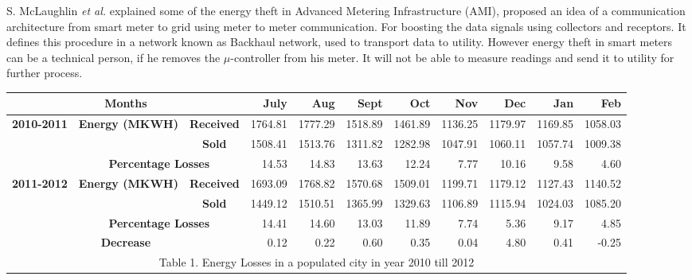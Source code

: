\documentclass[10pt, conference, compsocconf]{IEEEtran}
\begin{document}
S. McLaughlin \textit{et al.} explained some of the energy theft in Advanced Metering Infrastructure (AMI), proposed an idea of a communication architecture from smart meter to grid using meter to meter communication. For boosting the data signals using collectors and receptors. It defines this procedure in a network known as Backhaul network, used to transport data to utility. However energy theft in smart meters can be a technical person, if he removes the $\mu$-controller from his meter. It will not be able to measure readings and send it to utility for further process.

\begin{table*}[t]
\begin{center}
\begin{tabular}{|m{2cm}|c|c|r|r|r|r|r|r|r|r|}
\hline
\multicolumn{ 3}{|c|}{{\bf Months }} & {\bf July} & {\bf Aug} & {\bf Sept} & {\bf Oct} & {\bf Nov} & {\bf Dec} & {\bf Jan} & {\bf Feb} \\
\hline
\multicolumn{ 1}{|c|}{{\bf 2010-2011}} & \multicolumn{ 1}{|c|}{{\bf Energy (MKWH)}} & {\bf Received} &  1764.81 &  1777.29 &  1518.89 &  1461.89 &  1136.25 &  1179.97 &  1169.85 &  1058.03 \\ \cline{3-11}

\multicolumn{ 1}{|c|}{{\bf }} & \multicolumn{ 1}{|c|}{{\bf }} & {\bf Sold} &  1508.41 &  1513.76 &  1311.82 &  1282.98 &  1047.91 &  1060.11 &  1057.74 &  1009.38 \\
\cline{2-11}
\multicolumn{ 1}{|c|}{{\bf }} & \multicolumn{ 2}{|c|}{{\bf Percentage Losses}} &    14.53 &    14.83 &    13.63 &    12.24 &     7.77 &    10.16 &     9.58 &     4.60 \\
\hline
\multicolumn{ 1}{|c|}{{\bf 2011-2012}} & \multicolumn{ 1}{|c|}{{\bf Energy (MKWH)}} & {\bf Received} &  1693.09 &  1768.82 &  1570.68 &  1509.01 &  1199.71 &  1179.12 &  1127.43 &  1140.52 \\ \cline{3-11}

\multicolumn{ 1}{|c|}{{\bf }} & \multicolumn{ 1}{|c|}{{\bf }} & {\bf Sold} &  1449.12 &  1510.51 &  1365.99 &  1329.63 &  1106.89 &  1115.94 &  1024.03 &  1085.20 \\
\cline{2-11}
\multicolumn{ 1}{|c|}{{\bf }} & \multicolumn{ 2}{|c|}{{\bf Percentage Losses}} &    14.41 &    14.60 &    13.03 &    11.89 &     7.74 &     5.36 &     9.17 &     4.85 \\
\hline
\multicolumn{ 3}{|c|}{{\bf Decrease}} &     0.12 &     0.22 &     0.60 &     0.35 &     0.04 &     4.80 &     0.41 &    -0.25 \\
\hline
                                  \multicolumn{ 11}{c}{Table 1. Energy Losses in a populated city in year 2010 till 2012} \\
\end{tabular}
\end{center}
\end{table*}
\end{document}

